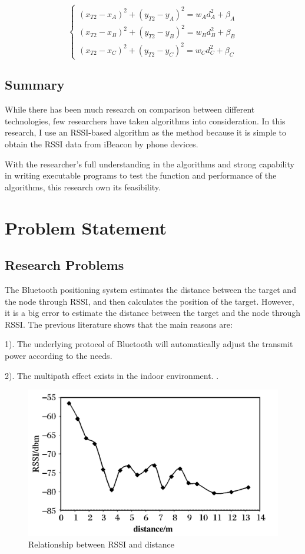 \documentclass{sigchi}
\begin{document}
\begin{equation*} \begin{cases} (x_{T2}-x_{A})^{2}+(y_{T2}-y_{A})^{2}=w_{A}d_{A}^{2}+\beta_{A}\\ (x_{T2}-x_{B})^{2}+(y_{T2}-y_{B})^{2}=w_{B}d_{B}^{2}+\beta_{B}\\ (x_{T2}-x_{C})^{2}+(y_{T2}-y_{C})^{2}=w_{C}d_{C}^{2}+\beta_{C} \end{cases} \tag{4} \end{equation*}

\subsection{Summary}
While there has been much research on comparison between different technologies, few researchers have taken algorithms into consideration. 
In this research, I use an RSSI-based algorithm as the method because it is simple to obtain the RSSI data from iBeacon by phone devices.

With the researcher's full understanding in the algorithms and strong capability in writing executable programs to test the function and performance of the algorithms, this research own its feasibility.

\section{Problem Statement}

\subsection{Research Problems}
The Bluetooth positioning system estimates the distance between the target and the node through RSSI, and then calculates the position of the target. However, it is a big error to estimate the distance between the target and the node through RSSI. The previous literature shows that the main reasons are:

1). The underlying protocol of Bluetooth will automatically adjust the transmit power according to the needs.

2). The multipath effect exists in the indoor environment. \cite{liu2007survey}.

\begin{figure}[!h]
\centering
\includegraphics[width=1\columnwidth]{3.png}
\caption{Relationship between RSSI and distance}
\label{fig:universe}
\end{figure}
\end{document}
